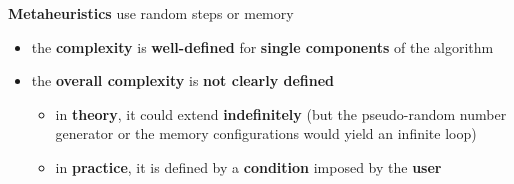 \textbf{Metaheuristics} use random steps or memory
\begin{itemize}
	\item the \textbf{complexity} is \textbf{well-defined} for \textbf{single components} of the algorithm
	\item the \textbf{overall complexity} is \textbf{not clearly defined}
	\begin{itemize}
		\item in \textbf{theory}, it could extend \textbf{indefinitely} (but the pseudo-random number generator or the memory configurations would yield an infinite loop)
		\item in \textbf{practice}, it is defined by a \textbf{condition} imposed by the \textbf{user} 
	\end{itemize}
\end{itemize}


\newpage